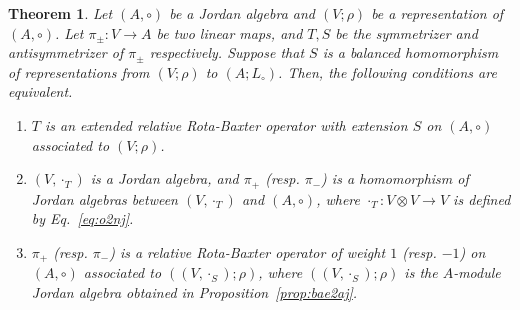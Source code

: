 \documentclass[12pt, reqno, a4paper]{amsart}
\newtheorem{theorem}{Theorem}[section]
\theoremstyle{definition}
\begin{document}
\begin{theorem}\label{thm:opm}
	Let $(A, \circ)$ be a Jordan algebra and $(V; \rho)$ be a representation of $(A, \circ)$. 
	Let $\pi_{\pm}: V \to A$ be two linear maps, and $T, S$ be the symmetrizer and antisymmetrizer of $\pi_{\pm}$ respectively.
	Suppose that $S$ is a balanced homomorphism of representations from $(V; \rho)$ to $(A; L_{\circ})$.
	Then, the following conditions are equivalent.
	\begin{enumerate}[label=(\roman*)]
		\item\label{it:oeoheo}
		      $T$ is an extended relative Rota-Baxter operator with extension $S$ on $(A, \circ)$ associated to $(V; \rho)$.

		\item\label{it:oeohh}
		      $(V, \cdot_{T})$ is a Jordan algebra, and $\pi_{+}$ (resp. $\pi_{-}$) is a homomorphism of Jordan algebras between $(V, \cdot_{T})$ and $(A, \circ)$, where $\cdot_{T}: V \otimes V \to V$ is defined by Eq.~\eqref{eq:o2nj}.


		\item\label{it:oeoho}
		      $\pi_{+}$ (resp. $\pi_{-}$) is a relative Rota-Baxter operator of weight $1$ (resp. $-1$) on $(A, \circ)$ associated to $((V, \cdot_{S}); \rho)$, where $((V, \cdot_{S}); \rho)$ is the $A$-module Jordan algebra obtained in Proposition~\ref{prop:bae2aj}.

	\end{enumerate}
\end{theorem}
\end{document}
